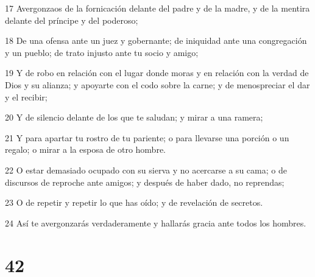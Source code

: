 \par 17 Avergonzaos de la fornicación delante del padre y de la madre, y de la mentira delante del príncipe y del poderoso;
\par 18 De una ofensa ante un juez y gobernante; de iniquidad ante una congregación y un pueblo; de trato injusto ante tu socio y amigo;
\par 19 Y de robo en relación con el lugar donde moras y en relación con la verdad de Dios y su alianza; y apoyarte con el codo sobre la carne; y de menospreciar el dar y el recibir;
\par 20 Y de silencio delante de los que te saludan; y mirar a una ramera;
\par 21 Y para apartar tu rostro de tu pariente; o para llevarse una porción o un regalo; o mirar a la esposa de otro hombre.
\par 22 O estar demasiado ocupado con su sierva y no acercarse a su cama; o de discursos de reproche ante amigos; y después de haber dado, no reprendas;
\par 23 O de repetir y repetir lo que has oído; y de revelación de secretos.
\par 24 Así te avergonzarás verdaderamente y hallarás gracia ante todos los hombres.

\chapter{42}

